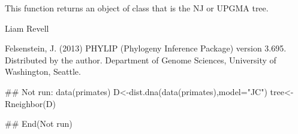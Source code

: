 \documentclass[a4paper]{book}
\begin{document}
%
\begin{Value}
This function returns an object of class  that is the NJ or UPGMA tree.
\end{Value}
%
\begin{Author}\relax
Liam Revell 
\end{Author}
%
\begin{References}\relax
Felsenstein, J. (2013) PHYLIP (Phylogeny Inference Package) version 3.695. Distributed by the author. Department of Genome Sciences, University of Washington, Seattle.
\end{References}
%
\begin{SeeAlso}\relax
{}
\end{SeeAlso}
%
\begin{Examples}
\begin{ExampleCode}
## Not run: 
data(primates)
D<-dist.dna(data(primates),model="JC")
tree<-Rneighbor(D)

## End(Not run)
\end{ExampleCode}
\end{Examples}
\printindex{}
\end{document}
